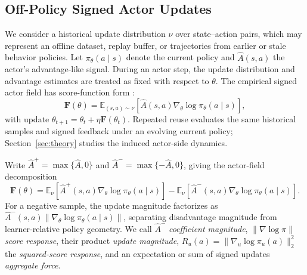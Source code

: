 \documentclass{article}
\theoremstyle{plain}
\theoremstyle{definition}
\theoremstyle{remark}
\begin{document}

\subsection{Off-Policy Signed Actor Updates}

We consider a historical update distribution $\nu$ over state--action pairs,
which may represent an offline dataset, replay buffer, or trajectories from
earlier or stale behavior policies. Let $\pi_\theta(a \mid s)$ denote the current policy and
$\widehat{A}(s,a)$ the actor's advantage-like signal. During an actor step, the update distribution and advantage estimates are
treated as fixed with respect to $\theta$. The empirical signed actor field has score-function form
\citep{williams1992simple,sutton2000policy}:
\begin{equation}
    \mathbf{F}(\theta)
    =
    \mathbb{E}_{(s,a)\sim\nu}
    \left[
        \widehat{A}(s,a)
        \nabla_\theta \log \pi_\theta(a \mid s)
    \right],
    \label{eq:empirical_actor_field}
\end{equation}
with update
\(\theta_{t+1}=\theta_t+\eta\mathbf{F}(\theta_t)\).
Repeated reuse evaluates the same historical samples and signed feedback
under an evolving current policy; Section~\ref{sec:theory} studies the induced
actor-side dynamics.

Write
\(\widehat A^{+}=\max\{\widehat A,0\}\) and
\(\widehat A^{-}=\max\{-\widehat A,0\}\), giving the actor-field decomposition
\begin{equation}
    \mathbf{F}(\theta)
    ={}
    \mathbb{E}_{\nu}
    \left[
        \widehat{A}^{+}(s,a)
        \nabla_\theta \log \pi_\theta(a \mid s)
    \right] 
    -
    \mathbb{E}_{\nu}
    \left[
        \widehat{A}^{-}(s,a)
        \nabla_\theta \log \pi_\theta(a \mid s)
    \right].
\label{eq:signed_actor_decomposition}
\end{equation}
For a negative sample, the update magnitude factorizes as
$\widehat{A}^{-}(s,a)\lVert\nabla_\theta \log \pi_\theta(a \mid s)\rVert$,
separating disadvantage magnitude from learner-relative policy geometry.
We call \(\widehat A^-\) \emph{coefficient magnitude},
\(\|\nabla\log\pi\|\) \emph{score response}, their product \emph{update
magnitude}, \(R_u(a)=\|\nabla_u\log\pi_u(a)\|_2^2\) the
\emph{squared-score response}, and an expectation or sum of signed updates
\emph{aggregate force}.
\end{document}

